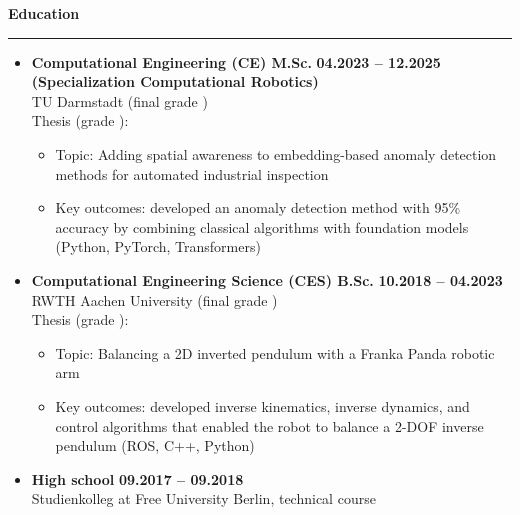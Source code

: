 \documentclass[12pt]{article} %
\newcommand{\HighlightedText}[1] {{\textbf{#1}}}
\newcommand{\PlaceAndTime}[2] {\HighlightedText{#1} \hfill \HighlightedText{#2}}
\newenvironment{ItemizeSection}[1]{
    \vspace{1mm}
    \HighlightedText{#1}
    \vspace{0.5mm}
    {\color{custom_blue} \hrule}
    \begin{itemize}[left=0.5em, topsep=0pt, itemsep=0pt, label={$\bullet$}]
}{
    \end{itemize}
}
\newenvironment{ItemizeSubsection}{
    \begin{itemize}[left=0.5em, topsep=-999pt, itemsep=0pt, label={$\circ$}]
}{
    \end{itemize}
}
\begin{document}
\vspace{-2.5mm}
\begin{ItemizeSection}{Education}
    \item \PlaceAndTime{Computational Engineering (CE) M.Sc.}{04.2023 -- 12.2025} \\
    \textbf{(Specialization Computational Robotics)} \\
    TU Darmstadt (final grade ) \\
    Thesis (grade ):
    \begin{ItemizeSubsection}
        \item Topic: Adding spatial awareness to embedding-based anomaly detection methods for automated industrial inspection
        \item Key outcomes: developed an anomaly detection method with 95\% accuracy by combining classical algorithms with foundation models (Python, PyTorch, Transformers)
    \end{ItemizeSubsection}

    \item \PlaceAndTime{Computational Engineering Science (CES) B.Sc.}{10.2018 -- 04.2023} \\
    RWTH Aachen University (final grade ) \\
    Thesis (grade ):
    \begin{ItemizeSubsection}
        \item Topic: Balancing a 2D inverted pendulum with a Franka Panda robotic arm
        \item Key outcomes: developed inverse kinematics, inverse dynamics, and control algorithms that enabled the robot to balance a 2-DOF inverse pendulum (ROS, C++, Python)
    \end{ItemizeSubsection}

    \item \PlaceAndTime{High school}{09.2017 -- 09.2018} \\
     Studienkolleg at Free University Berlin, technical course

\end{ItemizeSection}
\end{document}
